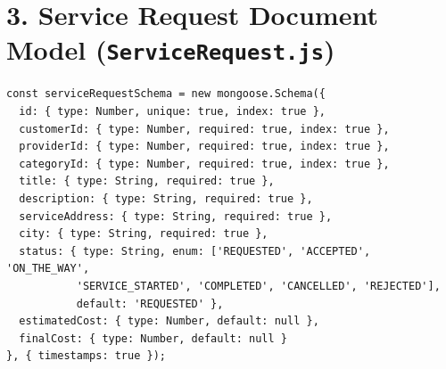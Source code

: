 \section*{3. Service Request Document Model (\texttt{ServiceRequest.js})}
\begin{verbatim}
const serviceRequestSchema = new mongoose.Schema({
  id: { type: Number, unique: true, index: true },
  customerId: { type: Number, required: true, index: true },
  providerId: { type: Number, required: true, index: true },
  categoryId: { type: Number, required: true, index: true },
  title: { type: String, required: true },
  description: { type: String, required: true },
  serviceAddress: { type: String, required: true },
  city: { type: String, required: true },
  status: { type: String, enum: ['REQUESTED', 'ACCEPTED', 'ON_THE_WAY', 
           'SERVICE_STARTED', 'COMPLETED', 'CANCELLED', 'REJECTED'], 
           default: 'REQUESTED' },
  estimatedCost: { type: Number, default: null },
  finalCost: { type: Number, default: null }
}, { timestamps: true });
\end{verbatim}
